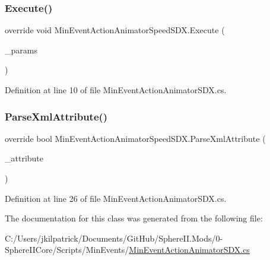 \subsubsection{\texorpdfstring{Execute()}{Execute()}}
{\footnotesize\ttfamily override void Min\+Event\+Action\+Animator\+Speed\+S\+D\+X.\+Execute (\begin{DoxyParamCaption}\item[{Min\+Event\+Params}]{\+\_\+params }\end{DoxyParamCaption})}



Definition at line 10 of file Min\+Event\+Action\+Animator\+S\+D\+X.\+cs.

\mbox{\label{class_min_event_action_animator_speed_s_d_x_aab4050a4d0a53fa0539594f9713ea74d}} 
\subsubsection{\texorpdfstring{ParseXmlAttribute()}{ParseXmlAttribute()}}
{\footnotesize\ttfamily override bool Min\+Event\+Action\+Animator\+Speed\+S\+D\+X.\+Parse\+Xml\+Attribute (\begin{DoxyParamCaption}\item[{Xml\+Attribute}]{\+\_\+attribute }\end{DoxyParamCaption})}



Definition at line 26 of file Min\+Event\+Action\+Animator\+S\+D\+X.\+cs.



The documentation for this class was generated from the following file\+:\begin{DoxyCompactItemize}
\item 
C\+:/\+Users/jkilpatrick/\+Documents/\+Git\+Hub/\+Sphere\+I\+I.\+Mods/0-\/\+Sphere\+I\+I\+Core/\+Scripts/\+Min\+Events/\mbox{\hyperlink{_min_event_action_animator_s_d_x_8cs}{Min\+Event\+Action\+Animator\+S\+D\+X.\+cs}}\end{DoxyCompactItemize}
